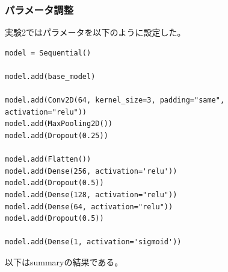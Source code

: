 \documentclass[a4paper, 11pt, titlepage]{jsarticle}
\begin{document}
\subsubsection{パラメータ調整}
実験2ではパラメータを以下のように設定した。\par
\begin{lstlisting}[caption=パラメータ(実験2),label=fuga]
model = Sequential()

model.add(base_model)

model.add(Conv2D(64, kernel_size=3, padding="same", activation="relu"))
model.add(MaxPooling2D())
model.add(Dropout(0.25))

model.add(Flatten())
model.add(Dense(256, activation='relu'))
model.add(Dropout(0.5))
model.add(Dense(128, activation="relu")) 
model.add(Dense(64, activation="relu")) 
model.add(Dropout(0.5))

model.add(Dense(1, activation='sigmoid'))

\end{lstlisting}\par
以下はsummaryの結果である。\par
\end{document}

